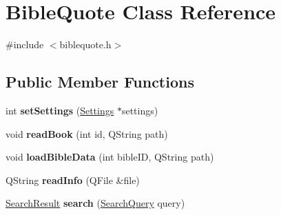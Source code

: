 \hypertarget{classBibleQuote}{
\section{BibleQuote Class Reference}
\label{classBibleQuote}
}


{\ttfamily \#include $<$biblequote.h$>$}\subsection*{Public Member Functions}
\begin{DoxyCompactItemize}
\item 
\hypertarget{classBibleQuote_a3d20c298cc87364e6fb9abc67352dfb9}{
int {\bfseries setSettings} (\hyperlink{classSettings}{Settings} $\ast$settings)}
\label{classBibleQuote_a3d20c298cc87364e6fb9abc67352dfb9}

\item 
\hypertarget{classBibleQuote_a58aedb76c7e070278619dc214bef5f7c}{
void {\bfseries readBook} (int id, QString path)}
\label{classBibleQuote_a58aedb76c7e070278619dc214bef5f7c}

\item 
\hypertarget{classBibleQuote_a0f9c1eb1346380d3f8e21c9cdf76390d}{
void {\bfseries loadBibleData} (int bibleID, QString path)}
\label{classBibleQuote_a0f9c1eb1346380d3f8e21c9cdf76390d}

\item 
\hypertarget{classBibleQuote_af4bd0be7d2ebf2b3fddc60757acf556a}{
QString {\bfseries readInfo} (QFile \&file)}
\label{classBibleQuote_af4bd0be7d2ebf2b3fddc60757acf556a}

\item 
\hypertarget{classBibleQuote_ab87214e63ac373631c5867e6d58cd69c}{
\hyperlink{classSearchResult}{SearchResult} {\bfseries search} (\hyperlink{classSearchQuery}{SearchQuery} query)}
\label{classBibleQuote_ab87214e63ac373631c5867e6d58cd69c}

\end{DoxyCompactItemize}
